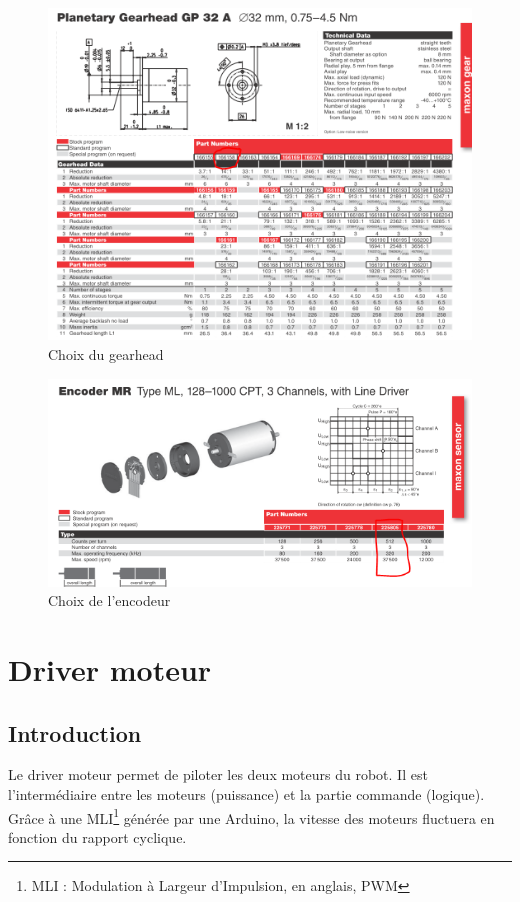 \begin{figure}[!hp]
	\centering
	\includegraphics[width=15cm]{Gearhead.PNG}
	\caption{Choix du gearhead}
	\label{img:gearhead}
\end{figure}

\begin{figure}[!hp]
	\centering
	\includegraphics[width=15cm]{Encoder.PNG}
	\caption{Choix de l'encodeur}
	\label{img:encoder}
\end{figure}

\newpage
\section{Driver moteur}
\subsection{Introduction}\label{intro}
Le driver moteur permet de piloter les deux moteurs du robot. Il est l’intermédiaire entre les moteurs (puissance) et la partie commande (logique). Grâce à une MLI\footnote{MLI : Modulation à Largeur d’Impulsion, en anglais, PWM} générée par une Arduino, la vitesse des moteurs fluctuera en fonction du rapport cyclique. \\

